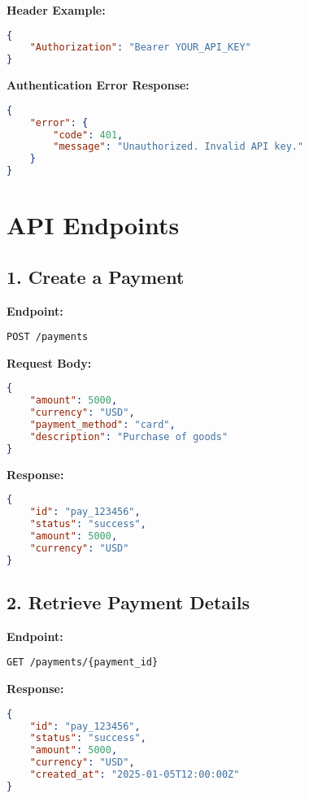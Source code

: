 \documentclass[a4paper,12pt]{article}
\begin{document}
\textbf{Header Example:}
\begin{lstlisting}[language=json]
{
    "Authorization": "Bearer YOUR_API_KEY"
}
\end{lstlisting}

\textbf{Authentication Error Response:}
\begin{lstlisting}[language=json]
{
    "error": {
        "code": 401,
        "message": "Unauthorized. Invalid API key."
    }
}
\end{lstlisting}

\newpage

\section{API Endpoints}

\subsection{1. Create a Payment}
\textbf{Endpoint:}
\begin{verbatim}
POST /payments
\end{verbatim}

\textbf{Request Body:}
\begin{lstlisting}[language=json]
{
    "amount": 5000,
    "currency": "USD",
    "payment_method": "card",
    "description": "Purchase of goods"
}
\end{lstlisting}

\textbf{Response:}
\begin{lstlisting}[language=json]
{
    "id": "pay_123456",
    "status": "success",
    "amount": 5000,
    "currency": "USD"
}
\end{lstlisting}

\subsection{2. Retrieve Payment Details}
\textbf{Endpoint:}
\begin{verbatim}
GET /payments/{payment_id}
\end{verbatim}

\textbf{Response:}
\begin{lstlisting}[language=json]
{
    "id": "pay_123456",
    "status": "success",
    "amount": 5000,
    "currency": "USD",
    "created_at": "2025-01-05T12:00:00Z"
}
\end{lstlisting}

\newpage
\end{document}
